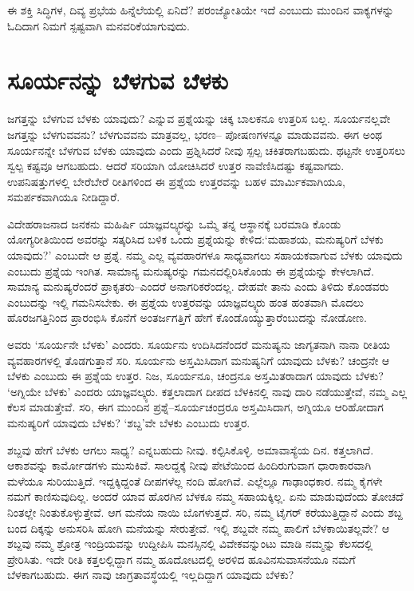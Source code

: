 ಈ ಶಕ್ತಿ ಸಿದ್ಧಿಗಳ, ದಿವ್ಯ ಪ್ರಭೆಯ ಹಿನ್ನೆಲೆಯಲ್ಲಿ ಏನಿದೆ? ಪರಂಜ್ಯೋತಿಯೇ ಇದೆ ಎಂಬುದು ಮುಂದಿನ ವಾಕ್ಯಗಳನ್ನು ಓದಿದಾಗ ನಿಮಗೆ ಸ್ಪಷ್ಟವಾಗಿ ಮನವರಿಕೆಯಾಗುವುದು.


\section*{ಸೂರ್ಯನನ್ನು ಬೆಳಗುವ ಬೆಳಕು}

\vskip -7pt

ಜಗತ್ತನ್ನು ಬೆಳಗುವ ಬೆಳಕು ಯಾವುದು? ಎನ್ನುವ ಪ್ರಶ್ನೆಯನ್ನು ಚಿಕ್ಕ ಬಾಲಕನೂ ಉತ್ತರಿಸ ಬಲ್ಲ. ಸೂರ್ಯನಲ್ಲವೇ ಜಗತ್ತನ್ನು ಬೆಳಗುವವನು? ಬೆಳಗುವವನು ಮಾತ್ರವಲ್ಲ, ಭರಣ– ಪೋಷಣಗಳನ್ನೂ ಮಾಡುವವನು. ಈಗ ಅಂಥ ಸೂರ್ಯನನ್ನೇ ಬೆಳಗುವ ಬೆಳಕು ಯಾವುದು ಎಂದು ಪ್ರಶ್ನಿಸಿದರೆ ನೀವು ಸ್ಪಲ್ಪ ಚಕಿತರಾಗಬಹುದು. ಥಟ್ಟನೇ ಉತ್ತರಿಸಲು ಸ್ವಲ್ಪ ಕಷ್ಟವೂ ಆಗಬಹುದು. ಆದರೆ ಸರಿಯಾಗಿ ಯೋಚಿಸಿದರೆ ಉತ್ತರ ನಾವೆಣಿಸಿದಷ್ಟು ಕಷ್ಟವಾಗದು. ಉಪನಿಷತ್ತುಗಳಲ್ಲಿ ಬೇರೆಬೇರೆ ರೀತಿಗಳಿಂದ ಈ ಪ್ರಶ್ನೆಯ ಉತ್ತರವನ್ನು ಬಹಳ ಮಾರ್ಮಿಕವಾಗಿಯೂ, ಸಮರ್ಪಕವಾಗಿಯೂ ನೀಡಿದ್ದಾರೆ.

ವಿದೇಹರಾಜನಾದ ಜನಕನು ಮಹಿರ್ಷಿ ಯಾಜ್ಞವಲ್ಕ್ಯರನ್ನು ಒಮ್ಮೆ ತನ್ನ ಆಸ್ಥಾನಕ್ಕೆ ಬರಮಾಡಿ ಕೊಂಡು ಯೋಗ್ಯರೀತಿಯಿಂದ ಅವರನ್ನು ಸತ್ಕರಿಸಿದ ಬಳಿಕ ಒಂದು ಪ್ರಶ್ನೆಯನ್ನು ಕೇಳಿದ:\break ‘ಮಹಾಶಯ, ಮನುಷ್ಯರಿಗೆ ಬೆಳಕು ಯಾವುದು?’ ಎಂಬುದೇ ಆ ಪ್ರಶ್ನೆ. ನಮ್ಮ ಎಲ್ಲ ವ್ಯವಹಾರಗಳೂ ಸಾಧ್ಯವಾಗಲು ಸಹಾಯಕವಾಗುವ ಬೆಳಕು ಯಾವುದು ಎಂಬುದು ಪ್ರಶ್ನೆಯ ಇಂಗಿತ. ಸಾಮಾನ್ಯ ಮನುಷ್ಯರನ್ನು ಗಮನದಲ್ಲಿರಿಸಿಕೊಂಡು ಈ ಪ್ರಶ್ನೆಯನ್ನು ಕೇಳಲಾಗಿದೆ. ಸಾಮಾನ್ಯ ಮನುಷ್ಯರೆಂದರೆ ಪ್ರಾಕೃತರು–ಎಂದರೆ ಅನಾಗರಿಕರೆಂದಲ್ಲ. ದೇಹವೇ ತಾನು ಎಂದು ತಿಳಿದು ಕೊಂಡವರು ಎಂಬುದನ್ನು ಇಲ್ಲಿ ಗಮನಿಸಬೇಕು. ಈ ಪ್ರಶ್ನೆಯ ಉತ್ತರವನ್ನು ಯಾಜ್ಞವಲ್ಕ್ಯರು ಹಂತ ಹಂತವಾಗಿ ಮೊದಲು ಹೊರಜಗತ್ತಿನಿಂದ ಪ್ರಾರಂಭಿಸಿ ಕೊನೆಗೆ ಅಂತರ್ಜಗತ್ತಿಗೆ ಹೇಗೆ ಕೊಂಡೊಯ್ಯುತ್ತಾರೆಂಬುದನ್ನು ನೋಡೋಣ.

ಅವರು ‘ಸೂರ್ಯನೇ ಬೆಳಕು’ ಎಂದರು. ಸೂರ್ಯನು ಉದಿಸಿದನೆಂದರೆ ಮನುಷ್ಯನು ಜಾಗೃತನಾಗಿ ನಾನಾ ರೀತಿಯ ವ್ಯವಹಾರಗಳಲ್ಲಿ ತೊಡಗುತ್ತಾನೆ ಸರಿ. ಸೂರ್ಯನು ಅಸ್ತಮಿಸಿದಾಗ ಮನುಷ್ಯನಿಗೆ ಯಾವುದು ಬೆಳಕು? ಚಂದ್ರನೇ ಆ ಬೆಳಕು ಎಂಬುದು ಈ ಪ್ರಶ್ನೆಯ ಉತ್ತರ. ನಿಜ, ಸೂರ್ಯನೂ, ಚಂದ್ರನೂ ಅಸ್ತಮಿತರಾದಾಗ ಯಾವುದು ಬೆಳಕು? ‘ಅಗ್ನಿಯೇ ಬೆಳಕು’ ಎಂದರು ಯಾಜ್ಞವಲ್ಕ್ಯರು. ಕತ್ತಲಾದಾಗ ದೀಪದ ಬೆಳಕಿನಲ್ಲಿ ನಾವು ದಾರಿ ನಡೆಯುತ್ತೇವೆ, ನಮ್ಮ ಎಲ್ಲ ಕೆಲಸ ಮಾಡುತ್ತೇವೆ. ಸರಿ, ಈಗ ಮುಂದಿನ ಪ್ರಶ್ನೆ–ಸೂರ್ಯಚಂದ್ರರೂ ಅಸ್ತಮಿಸಿದಾಗ, ಅಗ್ನಿಯೂ ಆರಿಹೋದಾಗ ಮನುಷ್ಯರಿಗೆ ಯಾವುದು ಬೆಳಕು? ‘ಶಬ್ದ’ವೇ ಬೆಳಕು ಎಂಬುದು ಉತ್ತರ.

ಶಬ್ದವು ಹೇಗೆ ಬೆಳಕು ಆಗಲು ಸಾಧ್ಯ? ಎನ್ನಬಹುದು ನೀವು. ಕಲ್ಪಿಸಿಕೊಳ್ಳಿ. ಅಮಾವಾಸ್ಯೆಯ ದಿನ. ಕತ್ತಲಾಗಿದೆ. ಆಕಾಶವನ್ನು ಕಾರ್ಮೋಡಗಳು ಮುಸುಕಿವೆ. ಸಾಲದ್ದಕ್ಕೆ ನೀವು ಪೇಟೆಯಿಂದ ಹಿಂದಿರುಗುವಾಗ ಧಾರಾಕಾರವಾಗಿ ಮಳೆಯೂ ಸುರಿಯುತ್ತಿದೆ. ಇದ್ದಕ್ಕಿದ್ದಂತೆ ದೀಪಗಳೆಲ್ಲ ನಂದಿ ಹೋಗಿವೆ. ಎಲ್ಲೆಲ್ಲೂ ಗಾಢಾಂಧಕಾರ. ನಮ್ಮ ಕೈಗಳೇ ನಮಗೆ ಕಾಣಿಸುವುದಿಲ್ಲ. ಅಂದರೆ ಯಾವ ಹೊರಗಿನ ಬೆಳಕೂ ನಮ್ಮ ಸಹಾಯಕ್ಕಿಲ್ಲ. ಏನು ಮಾಡುವುದೆಂದು ತೋಚದೆ ನಿಂತಲ್ಲೇ ನಿಂತುಕೊಳ್ಳುತ್ತೇವೆ. ಆಗ ಮನೆಯ ನಾಯಿ ಬೊಗಳುತ್ತದೆ. ಸರಿ, ನಮ್ಮ ಟೈಗರ್ ಕರೆಯುತ್ತಿದ್ದಾನೆ ಎಂದು ಶಬ್ದ ಬಂದ ದಿಕ್ಕನ್ನು ಅನುಸರಿಸಿ ಹೋಗಿ ಮನೆಯನ್ನು ಸೇರುತ್ತೇವೆ. ಇಲ್ಲಿ ಶಬ್ದವೇ ನಮ್ಮ ಪಾಲಿಗೆ ಬೆಳಕಾಯಿತಲ್ಲವೇ? ಆ ಶಬ್ದವು ನಮ್ಮ ಶ್ರೋತ್ರ ಇಂದ್ರಿಯವನ್ನು ಉದ್ದೀಪಿಸಿ ಮನಸ್ಸಿನಲ್ಲಿ ವಿವೇಕವನ್ನುಂಟು ಮಾಡಿ ನಮ್ಮನ್ನು ಕೆಲಸದಲ್ಲಿ ಪ್ರೇರಿಸಿತು. ಇದೇ ರೀತಿ ಕತ್ತಲಲ್ಲಿದ್ದಾಗ ನಮ್ಮ ಹೂದೋಟದಲ್ಲಿ ಅರಳಿದ ಹೂವಿನಸುವಾಸನೆಯೂ ನಮಗೆ ಬೆಳಕಾಗಬಹುದು. ಈಗ ನಾವು ಜಾಗ್ರತಾವಸ್ಥೆಯಲ್ಲಿ ಇಲ್ಲದಿದ್ದಾಗ ಯಾವುದು ಬೆಳಕು?

